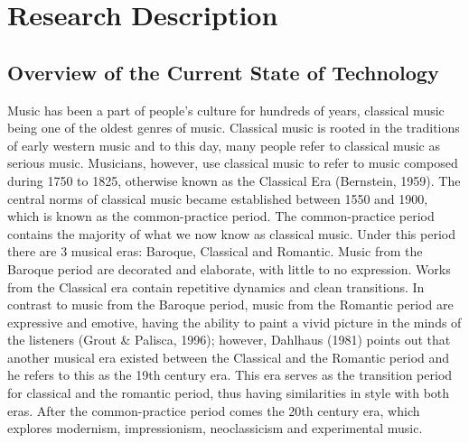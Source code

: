 %
%
%                 

\chapter{Research Description}
\label{sec:researchdesc}    %

\section{Overview of the Current State of Technology}
\label{sec:overview}
	Music has been a part of people's culture for hundreds of years, classical music being one of the oldest genres of music. Classical music is rooted in the traditions of early western music and to this day, many people refer to classical music as serious music. Musicians, however, use classical music to refer to music composed during 1750 to 1825, otherwise known as the Classical Era (Bernstein, 1959). The central norms of classical music became established between 1550 and 1900, which is known as the common-practice period. The common-practice period contains the majority of what we now know as classical music. Under this period there are 3 musical eras: Baroque, Classical and Romantic. Music from the Baroque period are decorated and elaborate, with little to no expression. Works from the Classical era contain repetitive dynamics and clean transitions. In contrast to music from the Baroque period, music from the Romantic period are expressive and emotive, having the ability to paint a vivid picture in the minds of the listeners (Grout \& Palisca, 1996); however, Dahlhaus (1981) points out that another musical era existed between the Classical and the Romantic period and he refers to this as the 19th century era. This era serves as the transition period for classical and the romantic period, thus having similarities in style with both eras. After the common-practice period comes the 20th century era, which explores modernism, impressionism, neoclassicism and experimental music. 

